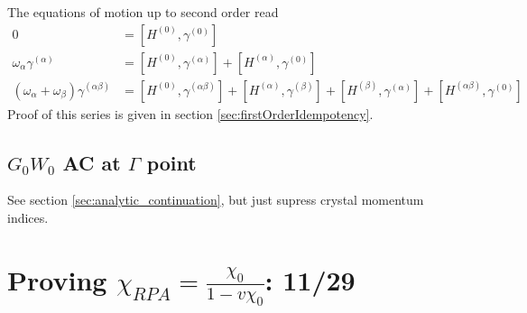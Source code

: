 \documentclass[12pt]{article}
\begin{document}
The equations of motion up to second order read
\begin{align}
0 &=\left[H^{(0)}, \gamma^{(0)}\right] \\
\omega_{\alpha} \gamma^{(\alpha)}& =\left[H^{(0)}, \gamma^{(\alpha)}\right]+\left[H^{(\alpha)}, \gamma^{(0)}\right]\\
\left(\omega_{\alpha}+\omega_{\beta}\right) \gamma^{(\alpha \beta)}& = {\left[H^{(0)}, \gamma^{(\alpha \beta)}\right]+\left[H^{(\alpha)}, \gamma^{(\beta)}\right] } +\left[H^{(\beta)}, \gamma^{(\alpha)}\right]+\left[H^{(\alpha \beta)}, \gamma^{(0)}\right]
\end{align}
Proof of this series is given in section \ref{sec:firstOrderIdempotency}. 
\subsection{$G_0W_0$ AC at $\Gamma$ point}
See section \ref{sec:analytic_continuation}, but just supress crystal momentum indices.
\section{Proving $\chi_{RPA}=\frac{\chi_0}{1-v\chi_0}$: 11/29}
\end{document}
